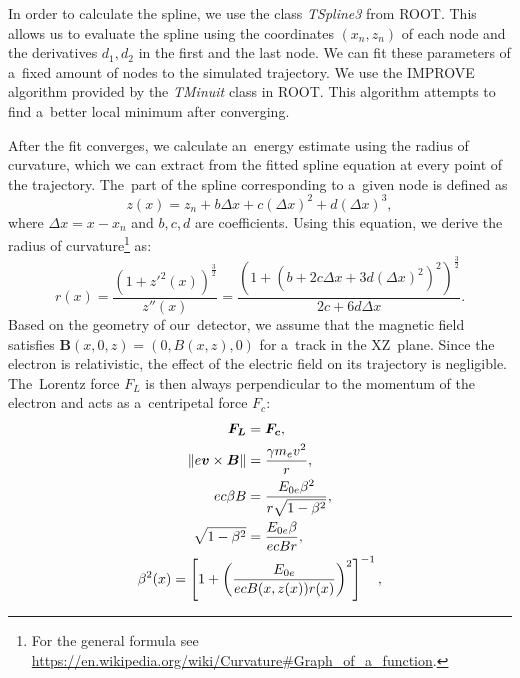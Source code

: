 		In order to calculate the spline, we use the class \textit{TSpline3} from ROOT. This allows us to evaluate the spline using the coordinates $(x_n,z_n)$ of each node and the derivatives $d_1,d_2$ in the first and the last node. We can fit these parameters of a~fixed amount of nodes to the simulated trajectory. We use the IMPROVE algorithm provided by the \textit{TMinuit} class in ROOT. This algorithm attempts to find a~better local minimum after converging.
		
		After the fit converges, we calculate an~energy estimate using the radius of curvature, which we can extract from the fitted spline equation at every point of the trajectory. The~part of the spline corresponding to a~given node is defined as
			\begin{equation}
				z(x) = z_n + b \Delta x+c(\Delta x)^2+d(\Delta x)^3,
			\end{equation}
		where $\Delta x = x-x_n$ and $b,c,d$ are coefficients. Using this equation, we derive the radius of curvature\footnote{For the general formula see \url{https://en.wikipedia.org/wiki/Curvature\#Graph_of_a_function}.} as:
			\begin{equation}
				r(x) = \frac{\left(1+z'^2(x)\right)^\frac{3}{2}}{z''(x)} = \frac{\left(1+\left(b+2c\Delta x+3d(\Delta x)^2\right)^2\right)^\frac{3}{2}}{2c+6d\Delta x}.
			\end{equation}
		Based on the geometry of our~detector, we assume that the magnetic field satisfies $\bm{B}(x,0,z) = (0,B(x,z),0)$ for a~track in the XZ~plane. Since the electron is relativistic, the effect of the electric field on its trajectory is negligible. The~Lorentz force $F_L$ is then always perpendicular to the momentum of the electron and acts as a~centripetal force $F_c$:
			\begin{gather}
				\begin{aligned}
					\bm{F_L} &= \bm{F_c},\\
					\norm{e\bm{v}\times\bm{B}} &= \frac{\gamma m_e v^2}{r},\\
					e c\beta B &= \frac{E_{0e} \beta^2}{r\sqrt{1-\beta^2}},\\
					\sqrt{1-\beta^2} &= \frac{E_{0e} \beta}{ecBr},
				\end{aligned}\\
				\beta^2(x) = \left[1+\left(\frac{E_{0e}}{ecB(x,z(x))r(x)}\right)^2\right]^{-1}, \label{eq:ekin1}
			\end{gather}
